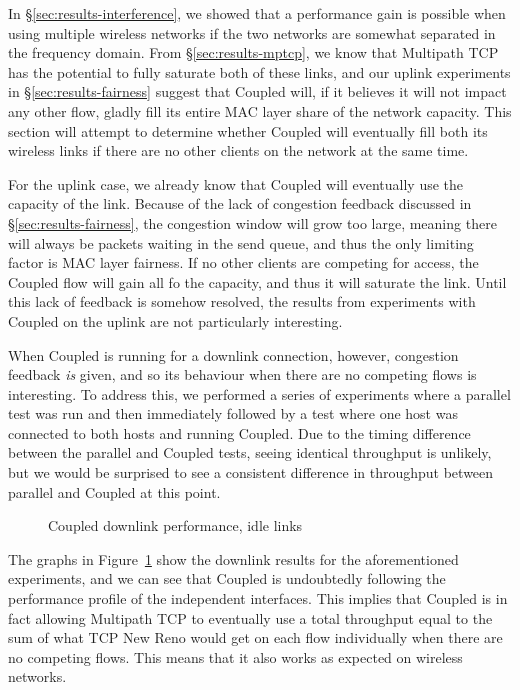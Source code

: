 In \S\ref{sec:results-interference}, we showed that a performance gain is
possible when using multiple wireless networks if the two networks are somewhat 
separated in the frequency domain. From \S\ref{sec:results-mptcp}, we know that 
Multipath TCP has the potential to fully saturate both of these links, and
our uplink experiments in \S\ref{sec:results-fairness} suggest that 
Coupled will, if it believes it will not impact any other flow, gladly fill 
its entire MAC layer share of the network capacity. This section will attempt to 
determine whether Coupled will eventually fill both its wireless links if there 
are no other clients on the network at the same time.

For the uplink case, we already know that Coupled will eventually use the
capacity of the link. Because of the lack of congestion feedback discussed in
\S\ref{sec:results-fairness}, the congestion window will grow too large,
meaning there will always be packets waiting in the send queue, and thus the
only limiting factor is MAC layer fairness. If no other clients are competing
for access, the Coupled flow will gain all fo the capacity, and thus it
will saturate the link. Until this lack of feedback is somehow resolved, the 
results from experiments with Coupled on the uplink are not particularly
interesting.

When Coupled is running for a downlink connection, however, congestion feedback
\emph{is} given, and so its behaviour when there are no competing flows is 
interesting. To address this, we performed a series of 
experiments where a parallel test was run and then immediately followed by a 
test where one host was connected to both hosts and running Coupled. Due to the 
timing difference between the parallel and Coupled tests, seeing identical 
throughput is unlikely, but we would be surprised to see a consistent difference 
in throughput between parallel and Coupled at this point.

\begin{figure}[h]
 \centering
 
 \caption{Coupled downlink performance, idle links}\label{graph:coupled-performance}
\end{figure}

The graphs in Figure~\ref{graph:coupled-performance} show the downlink results
for the aforementioned experiments, and we can see that Coupled is undoubtedly
following the performance profile of the independent interfaces. This implies
that Coupled is in fact allowing Multipath TCP to eventually use a total
throughput equal to the sum of what TCP New Reno would get on each flow
individually when there are no competing flows. This means that it also works as
expected on wireless networks.
